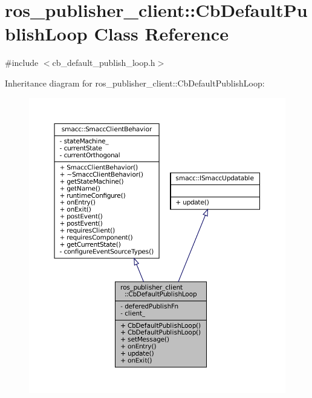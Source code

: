 \hypertarget{classros__publisher__client_1_1CbDefaultPublishLoop}{}\section{ros\+\_\+publisher\+\_\+client\+:\+:Cb\+Default\+Publish\+Loop Class Reference}
\label{classros__publisher__client_1_1CbDefaultPublishLoop}


{\ttfamily \#include $<$cb\+\_\+default\+\_\+publish\+\_\+loop.\+h$>$}



Inheritance diagram for ros\+\_\+publisher\+\_\+client\+:\+:Cb\+Default\+Publish\+Loop\+:
\nopagebreak
\begin{figure}[H]
\begin{center}
\leavevmode
\includegraphics[width=350pt]{classros__publisher__client_1_1CbDefaultPublishLoop__inherit__graph}
\end{center}
\end{figure}


